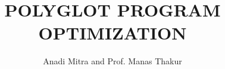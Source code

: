 \documentclass{beamer}
\title{POLYGLOT PROGRAM OPTIMIZATION}
\author{Anadi Mitra \hspace{3mm} and \hspace{3mm} Prof. Manas Thakur}
\newlength{\sepwidth}
\newlength{\colwidth}
\newcommand{\separatorcolumn}{\begin{column}{\sepwidth}\end{column}}
\begin{document}

\begin{frame}[t]
\begin{columns}[t]
\separatorcolumn
\begin{column}{\colwidth}
  \vspace{50mm}
  
  \vspace{40mm}
  
  \vspace{40mm}
  
  \vspace{50mm}
  
  \vspace{50mm}
  
  \vspace{50mm}
\end{column}
\separatorcolumn
\begin{column}{\colwidth}

  \vspace{50mm}
  
  \vspace{50mm}
  
  \vspace{50mm}
  
  \vspace{40mm}
  
  \vspace{50mm}
  
%  
%  

  \vspace{30mm}
  


%  
\end{column}
\end{columns}

\end{frame}
\end{document}
